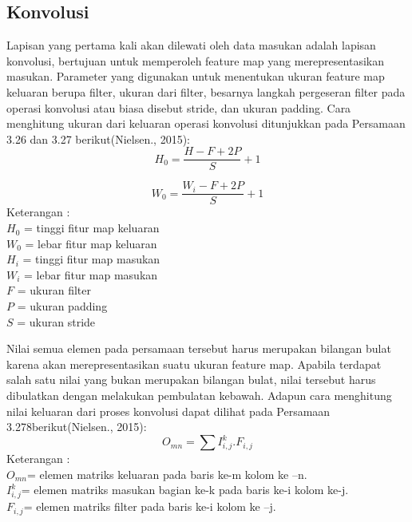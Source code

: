 \subsection{Konvolusi}
Lapisan yang pertama kali akan dilewati oleh data masukan adalah lapisan konvolusi, bertujuan untuk memperoleh feature map yang merepresentasikan masukan. Parameter yang digunakan untuk menentukan ukuran feature map keluaran berupa filter, ukuran dari filter, besarnya langkah pergeseran filter pada operasi konvolusi atau biasa disebut stride, dan ukuran padding. Cara menghitung ukuran dari keluaran operasi konvolusi ditunjukkan pada Persamaan 3.26 dan 3.27  berikut(Nielsen., 2015):
\begin{equation}
H_0 = \frac{H-F+2P}{S}+1
\end{equation}

\begin{equation}
W_0 = \frac{W_i-F+2P}{S}+1
\end{equation}
Keterangan : \\
\(H_0\) = tinggi fitur map keluaran
\\
\(W_0\) = lebar fitur map keluaran\\
\(H_i\) = tinggi fitur map masukan
\\
\(W_i\) = lebar fitur map masukan
\\
\(F\)  = ukuran filter
\\
\(P\)  = ukuran padding
\\
\(S\)  = ukuran stride 

Nilai semua elemen pada persamaan tersebut harus merupakan bilangan bulat karena akan merepresentasikan suatu ukuran feature map. Apabila terdapat salah satu nilai yang bukan merupakan bilangan bulat, nilai tersebut harus dibulatkan dengan melakukan pembulatan kebawah. Adapun cara menghitung nilai keluaran dari proses konvolusi dapat dilihat pada Persamaan 3.278berikut(Nielsen., 2015):
\begin{equation}
O_{mn}=\sum I^k_{i,j} . F_{i,j}
\end{equation}
Keterangan :
\\
\(O_{mn}\)= elemen matriks keluaran pada baris ke-m kolom ke –n.
\\
\(I^k_{i,j}\)= elemen matriks masukan bagian ke-k pada baris ke-i kolom ke-j. 
\\
\(F_{i,j}\)= elemen matriks filter pada baris ke-i kolom ke –j.
